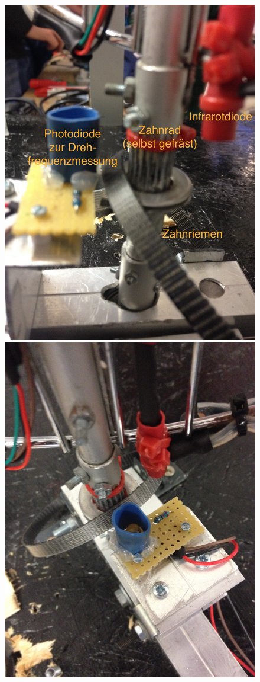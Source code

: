 \begin{frame}{}
\vspace*{-.5cm}
\begin{figure}
\hspace*{-.5cm}
\includegraphics[width=.525\textwidth]{Plots/Zahnriemen}
\hspace*{.1cm}
\includegraphics[width=.525\textwidth]{Plots/Photodiode}
\end{figure}
\end{frame}

